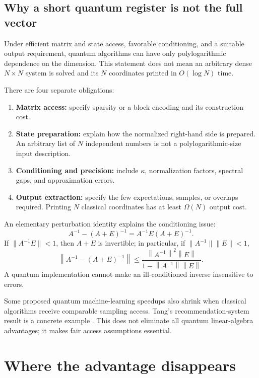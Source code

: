 \documentclass[11pt,a4paper]{article}
\newcommand{\norm}[1]{\left\lVert #1\right\rVert}
\theoremstyle{definition}
\theoremstyle{remark}
\numberwithin{equation}{section}
\begin{document}
\subsection{Why a short quantum register is not the full vector}
Under efficient matrix and state access, favorable conditioning, and a
suitable output requirement, quantum algorithms can have only
polylogarithmic dependence on the dimension. This statement does not mean
an arbitrary dense $N\times N$ system is solved and its $N$ coordinates
printed in $O(\log N)$ time.

There are four separate obligations:
\begin{enumerate}
 \item \textbf{Matrix access:} specify sparsity or a block encoding and its
 construction cost.
 \item \textbf{State preparation:} explain how the normalized right-hand side
 is prepared. An arbitrary list of $N$ independent numbers is not a
 polylogarithmic-size input description.
 \item \textbf{Conditioning and precision:} include $\kappa$, normalization
 factors, spectral gaps, and approximation errors.
 \item \textbf{Output extraction:} specify the few expectations, samples, or
 overlaps required. Printing $N$ classical coordinates has at least
 $\Omega(N)$ output cost.
\end{enumerate}

An elementary perturbation identity explains the conditioning issue:
\begin{equation}
 A^{-1}-(A+E)^{-1}=A^{-1}E(A+E)^{-1}.
\end{equation}
If $\|A^{-1}E\|<1$, then $A+E$ is invertible; in particular, if
$\|A^{-1}\|\|E\|<1$,
\begin{equation}
 \norm{A^{-1}-(A+E)^{-1}}
 \leq\frac{\norm{A^{-1}}^2\norm E}{1-\norm{A^{-1}}\norm E}.
\end{equation}
A quantum implementation cannot make an ill-conditioned inverse insensitive
to errors.

Some proposed quantum machine-learning speedups also shrink when classical
algorithms receive comparable sampling access. Tang's recommendation-system
result is a concrete example \citep{tang2019}. This does not eliminate all
quantum linear-algebra advantages; it makes fair access assumptions essential.

\section{Where the advantage disappears}\label{sec:boundaries}
\end{document}
